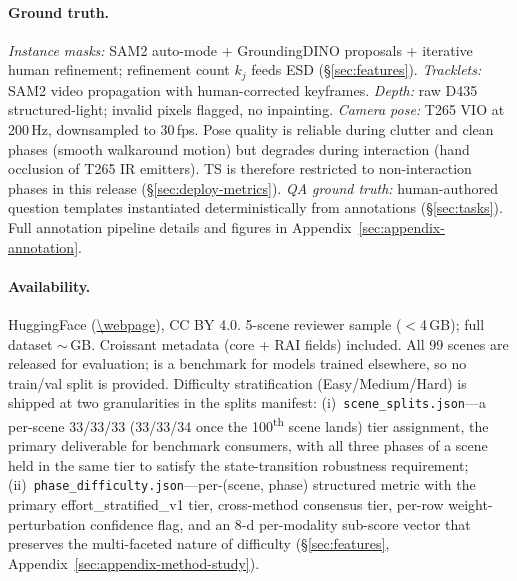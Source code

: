 \paragraph{Ground truth.}
\textit{Instance masks:} SAM2 auto-mode + GroundingDINO proposals + iterative human refinement; refinement count $k_j$ feeds ESD (\S\ref{sec:features}).
\textit{Tracklets:} SAM2 video propagation with human-corrected keyframes.
\textit{Depth:} raw D435 structured-light; invalid pixels flagged, no inpainting.
\textit{Camera pose:} T265 VIO at 200\,Hz, downsampled to 30\,fps.
Pose quality is reliable during clutter and clean phases (smooth walkaround motion) but degrades during interaction (hand occlusion of T265 IR emitters).
TS is therefore restricted to non-interaction phases in this release (\S\ref{sec:deploy-metrics}).
\textit{QA ground truth:} human-authored question templates instantiated deterministically from annotations (\S\ref{sec:tasks}).
Full annotation pipeline details and figures in Appendix~\ref{sec:appendix-annotation}.

\paragraph{Availability.}
HuggingFace (\url{\webpage}), CC BY 4.0.
5-scene reviewer sample ($<$4\,GB); full dataset ${\sim}$\,GB.
Croissant metadata (core + RAI fields) included.
All 99 scenes are released for evaluation; \coolname{} is a benchmark for models trained elsewhere, so no train/val split is provided.
Difficulty stratification (Easy/Medium/Hard) is shipped at two granularities in the splits manifest:
(i)~\texttt{scene\_splits.json}---a per-scene 33/33/33 (33/33/34 once the 100\textsuperscript{th} scene lands) tier assignment, the primary deliverable for benchmark consumers, with all three phases of a scene held in the same tier to satisfy the state-transition robustness requirement;
(ii)~\texttt{phase\_difficulty.json}---per-(scene, phase) structured metric with the primary effort\_stratified\_v1 tier, cross-method consensus tier, per-row weight-perturbation confidence flag, and an 8-d per-modality sub-score vector that preserves the multi-faceted nature of difficulty (\S\ref{sec:features}, Appendix~\ref{sec:appendix-method-study}).
